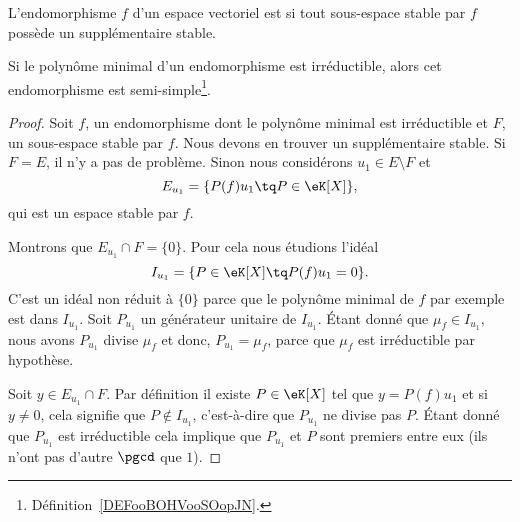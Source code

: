 \begin{definition}  \label{DEFooBOHVooSOopJN}
	L'endomorphisme \( f\) d'un espace vectoriel est  si tout sous-espace stable par \( f\) possède un supplémentaire stable.
\end{definition}

\begin{lemma}   \label{LemrFINYT}
	Si le polynôme minimal d'un endomorphisme est irréductible, alors cet endomorphisme est semi-simple\footnote{Définition~\ref{DEFooBOHVooSOopJN}.}.
\end{lemma}

\begin{proof}
	Soit \( f\), un endomorphisme dont le polynôme minimal est irréductible et \( F\), un sous-espace stable par \( f\). Nous devons en trouver un supplémentaire stable. Si \( F=E\), il n'y a pas de problème. Sinon nous considérons \( u_1\in E\setminus F\) et
	\begin{equation}
		E_{u_1}=\{ P(f)u_1\tq P\in \eK[X] \},
	\end{equation}
	qui est un espace stable par \( f\).

	Montrons que \( E_{u_1}\cap F=\{ 0 \}\). Pour cela nous étudions l'idéal
	\begin{equation}
		I_{u_1}=\{ P\in \eK[X]\tq P(f)u_1=0 \}.
	\end{equation}
	C'est un idéal non réduit à \( \{ 0 \}\) parce que le polynôme minimal de \( f\) par exemple est dans \( I_{u_1}\). Soit \( P_{u_1}\) un générateur unitaire de \( I_{u_1}\). Étant donné que \( \mu_f\in I_{u_1}\), nous avons \( P_{u_1}\) divise \( \mu_f\) et donc, \( P_{u_1}=\mu_f\), parce que \( \mu_f\) est irréductible par hypothèse.

	Soit \( y\in E_{u_1}\cap F\). Par définition il existe \( P\in\eK[X]\) tel que \( y=P(f)u_1\) et si \( y\neq 0\), cela signifie que \( P\notin I_{u_1}\), c'est-à-dire que \( P_{u_1} \) ne divise pas \( P\). Étant donné que \( P_{u_1}\) est irréductible cela implique que \( P_{u_1}\) et \( P\) sont premiers entre eux (ils n'ont pas d'autre \( \pgcd\) que \( 1\)).


\end{proof}
